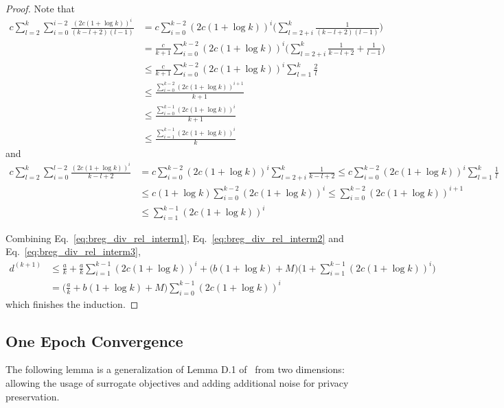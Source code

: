 \begin{proof}
    Note that
    \begin{align}
        c \sum_{l=2}^{k} \sum_{i=0}^{i-2} \frac{(2c(1+\log k))^i}{(k-l+2) (l-1)}
        &= c \sum_{i=0}^{k-2} (2c(1+\log k))^i \Big(\sum_{l=2+i}^{k} \frac{1}{(k-l+2)(l-1)} \Big)\\
        &= \frac{c}{k+1}\sum_{i=0}^{k-2} (2c(1+\log k))^{i} \Big(
        \sum_{l=2+i}^{k} \frac{1}{k-l+2} + \frac{1}{l-1}
        \Big)\\
        &\leq \frac{c}{k+1}\sum_{i=0}^{k-2} (2c(1+\log k))^{i}
        \sum_{l=1}^{k} \frac{2}{l}\\
        &\leq \frac{\sum_{i=0}^{k-2} (2c(1+\log k))^{i+1}}{k+1}\\
        &\leq \frac{\sum_{i=0}^{k-1} (2c(1+\log k))^i}{k+1}\\
    \label{eq:breg_div_rel_interm2}
        &\leq \frac{\sum_{i=1}^{k-1} (2c (1+\log k))^i}{k}
    \end{align}
    and
    \begin{align}
        c \sum_{l=2}^{k}\sum_{i=0}^{l-2} \frac{(2c(1+\log k))^i}{k-l+2}
        &= c \sum_{i=0}^{k-2} (2c(1+\log k))^i
        \sum_{l=2+i}^{k} \frac{1}{k-l+2}
        \leq c \sum_{i=0}^{k-2} (2c(1+\log k))^i
        \sum_{l=1}^{k} \frac{1}{l}\\
        &\leq c(1+\log k)\sum_{i=0}^{k-2} (2c(1+\log k))^{i} 
        \leq \sum_{i=0}^{k-2} (2c(1+\log k))^{i+1}\\
    \label{eq:breg_div_rel_interm3}
        &\leq \sum_{i=1}^{k-1} (2c(1+\log k))^{i}
    \end{align}

    Combining Eq.~\ref{eq:breg_div_rel_interm1}, Eq.~\ref{eq:breg_div_rel_interm2} and Eq.~\ref{eq:breg_div_rel_interm3}, 
    \begin{align}
        d^{(k+1)}
        &\leq \frac{a}{k} + \frac{a}{k} \sum_{i=1}^{k-1}(2c(1+\log k))^{i}
        + \Big(b (1+\log k) + M \Big)\Big( 1 + \sum_{i=1}^{k-1}(2c(1+\log k))^{i} \Big)\\
        &= \Big( \frac{a}{k} + b(1+\log k) + M \Big) \sum_{i=0}^{k-1} (2c(1+\log k))^{i}
    \end{align}
    which finishes the induction.
    
\end{proof}



\subsection{One Epoch Convergence}
\label{subsec:appendix_one_epoch_convergence}
The following lemma  is a generalization of Lemma D.1 of~\cite{liu2024last_iterate_shuffled_gradient} from two dimensions: allowing the usage of surrogate objectives and adding additional noise for privacy preservation. 

